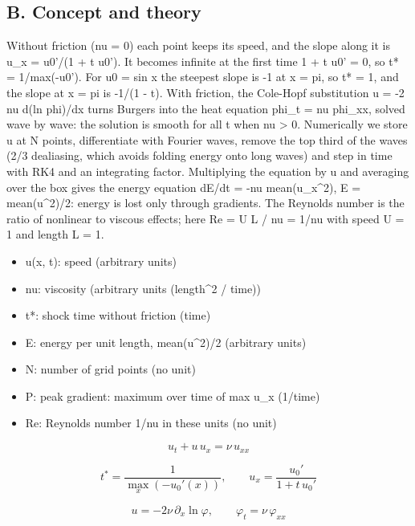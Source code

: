 \documentclass[11pt,a4paper]{article}
\begin{document}
\subsection*{B. Concept and theory}
Without friction (nu = 0) each point keeps its speed, and the slope along it is u\_x = u0'/(1 + t u0'). It becomes infinite at the first time 1 + t u0' = 0, so t* = 1/max(-u0'). For u0 = sin x the steepest slope is -1 at x = pi, so t* = 1, and the slope at x = pi is -1/(1 - t). With friction, the Cole-Hopf substitution u = -2 nu d(ln phi)/dx turns Burgers into the heat equation phi\_t = nu phi\_xx, solved wave by wave: the solution is smooth for all t when nu \textgreater{} 0. Numerically we store u at N points, differentiate with Fourier waves, remove the top third of the waves (2/3 dealiasing, which avoids folding energy onto long waves) and step in time with RK4 and an integrating factor. Multiplying the equation by u and averaging over the box gives the energy equation dE/dt = -nu mean(u\_x\textasciicircum{}2), E = mean(u\textasciicircum{}2)/2: energy is lost only through gradients. The Reynolds number is the ratio of nonlinear to viscous effects; here Re = U L / nu = 1/nu with speed U = 1 and length L = 1.

\begin{itemize}[nosep]
\item u(x, t): speed (arbitrary units)
\item nu: viscosity (arbitrary units (length\textasciicircum{}2 / time))
\item t*: shock time without friction (time)
\item E: energy per unit length, mean(u\textasciicircum{}2)/2 (arbitrary units)
\item N: number of grid points (no unit)
\item P: peak gradient: maximum over time of max \textbar{}u\_x\textbar{} (1/time)
\item Re: Reynolds number 1/nu in these units (no unit)
\end{itemize}

\begin{equation*}
u_t+u\,u_x=\nu\,u_{xx}
\end{equation*}

\begin{equation*}
t^{*}=\frac{1}{\max_x\left(-u_0'(x)\right)},\qquad u_x=\frac{u_0'}{1+t\,u_0'}
\end{equation*}

\begin{equation*}
u=-2\nu\,\partial_x\ln\varphi,\qquad \varphi_t=\nu\,\varphi_{xx}
\end{equation*}
\end{document}
